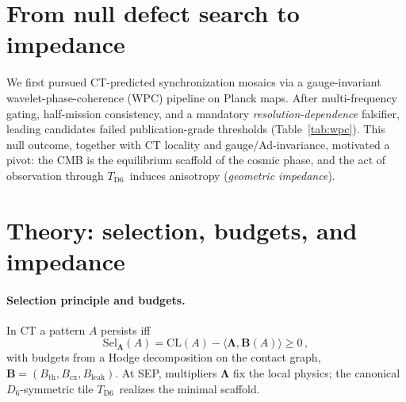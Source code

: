 \documentclass[reprint,aps,prl,twocolumn,nofootinbib,longbibliography]{revtex4-2}
\DeclareRobustCommand{\Sel}{\mathrm{Sel}}
\DeclareRobustCommand{\CL}{\mathrm{CL}}
\DeclareRobustCommand{\Budget}{\mathbf{B}}
\DeclareRobustCommand{\Lam}{\bm{\Lambda}}
\DeclareRobustCommand{\Bth}{B_{\mathrm{th}}}
\DeclareRobustCommand{\Bcx}{B_{\mathrm{cx}}}
\DeclareRobustCommand{\Bleak}{B_{\mathrm{leak}}}
\DeclareRobustCommand{\TDS}{\ensuremath{T_{\mathrm{D6}}}}
\begin{document}
\section{From null defect search to impedance}
We first pursued CT-predicted synchronization mosaics via a gauge-invariant wavelet-phase-coherence (WPC) pipeline on Planck maps. After multi-frequency gating, half-mission consistency, and a mandatory \emph{resolution-dependence} falsifier, leading candidates failed publication-grade thresholds (Table~\ref{tab:wpc}). This null outcome, together with CT locality and gauge/Ad-invariance, motivated a pivot: the CMB is the equilibrium scaffold of the cosmic phase, and the act of observation through \TDS\ induces anisotropy (\emph{geometric impedance}).

\section{Theory: selection, budgets, and impedance}
\paragraph{Selection principle and budgets.}
In CT a pattern $A$ persists iff
\begin{equation}
\Sel_{\Lam}(A) = \CL(A)-\langle \Lam, \Budget(A)\rangle \ge 0\,,\label{eq:Sel}
\end{equation}
with budgets from a Hodge decomposition on the contact graph, $\Budget=(\Bth,\Bcx,\Bleak)$. At SEP, multipliers $\Lam$ fix the local physics; the canonical $D_6$-symmetric tile \TDS\ realizes the minimal scaffold.
\end{document}
